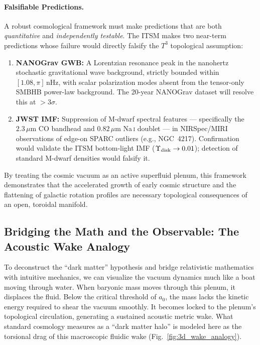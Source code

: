 \documentclass[aps,prd,10pt,twocolumn,superscriptaddress,nofootinbib,floatfix]{revtex4-2}
\begin{document}
\paragraph{Falsifiable Predictions.}
A robust cosmological framework must make predictions that are both \emph{quantitative} and \emph{independently testable}. The ITSM makes two near-term predictions whose failure would directly falsify the $T^3$ topological assumption:
\begin{enumerate}
    \item \textbf{NANOGrav GWB:} A Lorentzian resonance peak in the nanohertz stochastic gravitational wave background, strictly bounded within $[1.08, \pi]\,\text{nHz}$, with scalar polarization modes absent from the tensor-only SMBHB power-law background. The 20-year NANOGrav dataset will resolve this at $>3\sigma$.
    \item \textbf{JWST IMF:} Suppression of M-dwarf spectral features --- specifically the $2.3\,\mu\text{m}$ CO bandhead and $0.82\,\mu\text{m}$ Na\,\textsc{i} doublet --- in NIRSpec/MIRI observations of edge-on SPARC outliers (e.g., NGC~4217). Confirmation would validate the ITSM bottom-light IMF ($\Upsilon_{\rm disk}\to 0.01$); detection of standard M-dwarf densities would falsify it.
\end{enumerate}

By treating the cosmic vacuum as an active superfluid plenum, this framework demonstrates that the accelerated growth of early cosmic structure and the flattening of galactic rotation profiles are necessary topological consequences of an open, toroidal manifold.

\subsection{Bridging the Math and the Observable: The Acoustic Wake Analogy}
To deconstruct the ``dark matter'' hypothesis and bridge relativistic mathematics with intuitive mechanics, we can visualize the vacuum dynamics much like a boat moving through water. When baryonic mass moves through this plenum, it displaces the fluid. Below the critical threshold of $a_0$, the mass lacks the kinetic energy required to shear the vacuum smoothly. It becomes locked to the plenum's topological circulation, generating a sustained acoustic metric wake. What standard cosmology measures as a ``dark matter halo'' is modeled here as the torsional drag of this macroscopic fluidic wake (Fig.~\ref{fig:3d_wake_analogy}).
\end{document}
